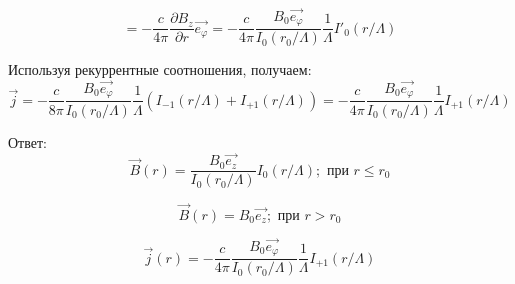 \documentclass[12pt]{article}
\begin{document}
\begin{large}
\begin{multline*}
    \end{multline*}
\[
    = -\frac{c}{4\pi} \frac{\partial B_z}{\partial r} \overrightarrow{e_\varphi} = -\frac{c}{4\pi} \frac{B_0 \overrightarrow{e_\varphi}}{I_0(r_0/\Lambda)} \frac{1}{\Lambda} I'_0(r/\Lambda)
\]
\par Используя рекуррентные соотношения, получаем:
\[
   \vec{j} = -\frac{c}{8\pi} \frac{B_0 \overrightarrow{e_\varphi}}{I_0(r_0/\Lambda)} \frac{1}{\Lambda} \left( I_{-1}(r/\Lambda) + I_{+1}(r/\Lambda) \right) = -\frac{c}{4\pi} \frac{B_0 \overrightarrow{e_\varphi}}{I_0(r_0/\Lambda)} \frac{1}{\Lambda} I_{+1}(r/\Lambda)
\]
\par Ответ:
\[
    \overrightarrow{B}(r) = \frac{B_0 \overrightarrow{e_z}}{I_0(r_0/\Lambda)} I_0(r/\Lambda); \text{ при } r \leqslant r_0
\]
\par
\[
    \overrightarrow{B}(r) = B_0 \overrightarrow{e_z}; \text{ при } r > r_0
\]
\par
\[
   \vec{j}(r) = -\frac{c}{4\pi} \frac{B_0 \overrightarrow{e_\varphi}}{I_0(r_0/\Lambda)} \frac{1}{\Lambda} I_{+1}(r/\Lambda)
\]
\end{large}
\end{document}
